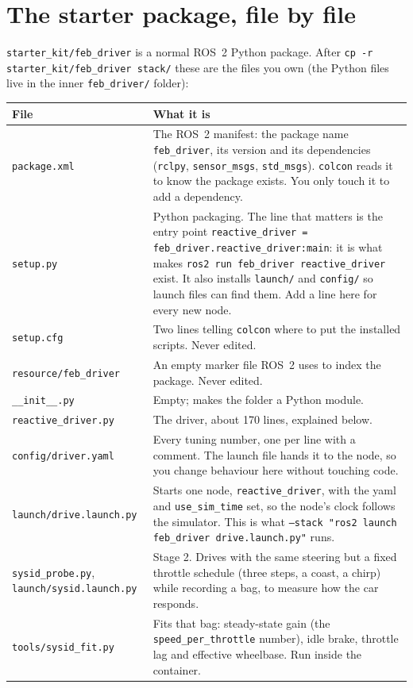 
\section{The starter package, file by file}
\label{app:starter}

\texttt{starter\_kit/feb\_driver} is a normal ROS~2 Python package. After
\texttt{cp -r starter\_kit/feb\_driver stack/} these are the files you own (the Python files live in the inner \texttt{feb\_driver/} folder):

\begin{tabularx}{\linewidth}{p{4.4cm}X}
\toprule
File & What it is \\
\midrule
\texttt{package.xml} & The ROS~2 manifest: the package name \texttt{feb\_driver}, its version and
its dependencies (\texttt{rclpy}, \texttt{sensor\_msgs}, \texttt{std\_msgs}). \texttt{colcon}
reads it to know the package exists. You only touch it to add a dependency. \\
\texttt{setup.py} & Python packaging. The line that matters is the entry point
\texttt{reactive\_driver = feb\_driver.reactive\_driver:main}: it is what makes
\texttt{ros2 run feb\_driver reactive\_driver} exist. It also installs \texttt{launch/} and
\texttt{config/} so launch files can find them. Add a line here for every new node. \\
\texttt{setup.cfg} & Two lines telling \texttt{colcon} where to put the installed scripts. Never edited. \\
\texttt{resource/feb\_driver} & An empty marker file ROS~2 uses to index the package. Never edited. \\
\texttt{\_\_init\_\_.py} & Empty; makes the folder a Python module. \\
\texttt{reactive\_driver.py} & The driver, about 170 lines, explained below. \\
\texttt{config/driver.yaml} & Every tuning number, one per line with a comment. The launch file
hands it to the node, so you change behaviour here without touching code. \\
\texttt{launch/drive.launch.py} & Starts one node, \texttt{reactive\_driver}, with the yaml and
\texttt{use\_sim\_time} set, so the node's clock follows the simulator. This is what
\texttt{--stack "ros2 launch feb\_driver drive.launch.py"} runs. \\
\texttt{sysid\_probe.py}, \texttt{launch/sysid.launch.py} & Stage 2. Drives with the
same steering but a fixed throttle schedule (three steps, a coast, a chirp) while recording a
bag, to measure how the car responds. \\
\texttt{tools/sysid\_fit.py} & Fits that bag: steady-state gain (the \texttt{speed\_per\_throttle}
number), idle brake, throttle lag and effective wheelbase. Run inside the container. \\
\bottomrule
\end{tabularx}

